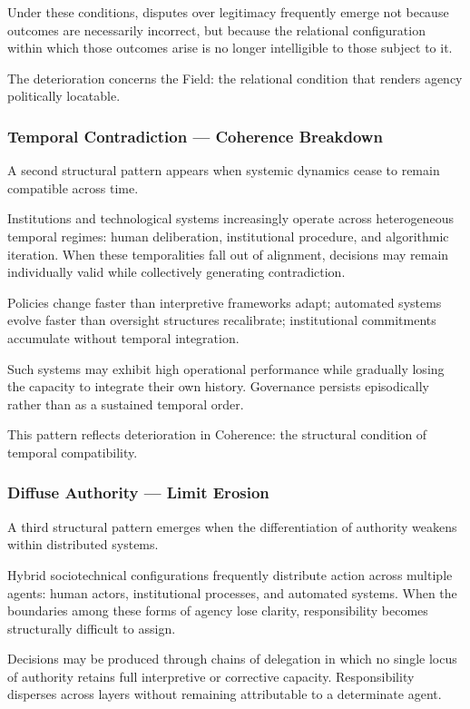 \documentclass[12pt]{article}
\begin{document}
Under these conditions, disputes over legitimacy frequently emerge not because outcomes are necessarily incorrect, but because the relational configuration within which those outcomes arise is no longer intelligible to those subject to it.

The deterioration concerns the Field: the relational condition that renders agency politically locatable.

\subsubsection{Temporal Contradiction — Coherence Breakdown}


A second structural pattern appears when systemic dynamics cease to remain compatible across time.

Institutions and technological systems increasingly operate across heterogeneous temporal regimes: human deliberation, institutional procedure, and algorithmic iteration. When these temporalities fall out of alignment, decisions may remain individually valid while collectively generating contradiction.

Policies change faster than interpretive frameworks adapt; automated systems evolve faster than oversight structures recalibrate; institutional commitments accumulate without temporal integration.

Such systems may exhibit high operational performance while gradually losing the capacity to integrate their own history. Governance persists episodically rather than as a sustained temporal order.

This pattern reflects deterioration in Coherence: the structural condition of temporal compatibility.

\subsubsection{Diffuse Authority — Limit Erosion}


A third structural pattern emerges when the differentiation of authority weakens within distributed systems.

Hybrid sociotechnical configurations frequently distribute action across multiple agents: human actors, institutional processes, and automated systems. When the boundaries among these forms of agency lose clarity, responsibility becomes structurally difficult to assign.

Decisions may be produced through chains of delegation in which no single locus of authority retains full interpretive or corrective capacity. Responsibility disperses across layers without remaining attributable to a determinate agent.
\end{document}
